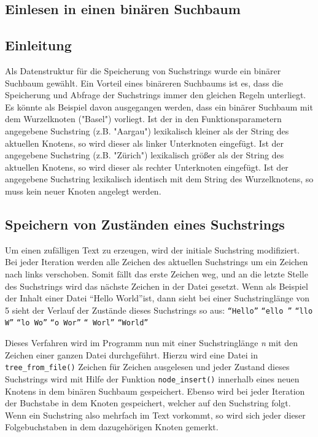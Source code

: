 \documentclass[10pt,a4paper]{article}
\begin{document}
\begin{spacing}{1}
\section{Einlesen in einen binären Suchbaum}

\subsection{Einleitung}
Als Datenstruktur für die Speicherung von Suchstrings wurde ein binärer Suchbaum
gewählt. Ein Vorteil eines binäreren Suchbaums ist es, dass die Speicherung
und Abfrage der Suchstrings immer den gleichen Regeln unterliegt.  
Es könnte als Beispiel davon ausgegangen werden, dass ein binärer Suchbaum
mit dem Wurzelknoten ("Basel") vorliegt. Ist der in den Funktionsparametern
angegebene Suchstring (z.B. "Aargau") lexikalisch kleiner als der String des
aktuellen Knotens, so wird dieser als linker Unterknoten eingefügt.
Ist der angegebene Suchstring  (z.B. "Zürich") lexikalisch größer als der String
des aktuellen Knotens, so wird dieser als rechter Unterknoten eingefügt.
Ist der angegebene Suchstring lexikalisch identisch mit dem String des
Wurzelknotens, so muss kein neuer Knoten angelegt werden.

\subsection{Speichern von Zuständen eines Suchstrings}
Um einen zufälligen Text zu erzeugen, wird der initiale Suchstring modifiziert.
Bei jeder Iteration werden alle Zeichen des aktuellen Suchstrings um ein
Zeichen nach links verschoben. Somit fällt das erste Zeichen weg,
und an die letzte Stelle des Suchstrings wird das nächste Zeichen in der Datei
gesetzt. Wenn als Beispiel der Inhalt einer Datei ``Hello World''ist, dann sieht
bei einer Suchstringlänge von 5 sieht der Verlauf der Zustände dieses
Suchstrings so aus:\newline
 \texttt{``Hello''} \textrightarrow \texttt{``ello ''} \textrightarrow \texttt{``llo W''}
\textrightarrow \texttt{``lo Wo''} \textrightarrow \texttt{``o Wor''} \textrightarrow
\texttt{`` Worl''} \textrightarrow \texttt{``World''}

Dieses Verfahren wird im Programm nun mit einer Suchstringlänge {\it n\/} mit den Zeichen einer
ganzen Datei durchgeführt. Hierzu wird eine Datei in \texttt{tree\_from\_file()}
Zeichen für Zeichen ausgelesen und jeder Zustand dieses Suchstrings wird mit Hilfe
der Funktion \texttt{node\_insert()} innerhalb eines neuen Knotens in dem binären
Suchbaum gespeichert. Ebenso wird bei jeder Iteration der Buchstabe in dem
Knoten gespeichert, welcher auf den Suchstring folgt. Wenn ein Suchstring also
mehrfach im Text vorkommt, so wird sich jeder dieser Folgebuchstaben in
dem dazugehörigen Knoten gemerkt.


\end{spacing}
\end{document}
